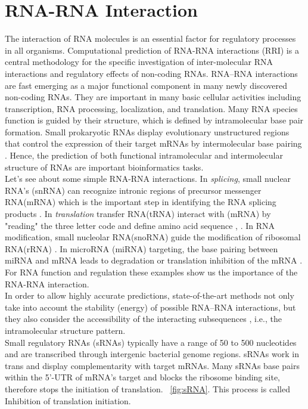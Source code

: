 \documentclass[twoside,a4paper]{report}
\numberwithin{equation}{section}
\begin{document}
	\section{RNA-RNA Interaction}
 	The interaction of RNA molecules is an essential factor for regulatory processes in all organisms. Computational prediction of RNA-RNA interactions (RRI) is a central methodology for the specific investigation of inter-molecular RNA interactions and regulatory effects of non-coding RNAs. RNA–RNA interactions are fast emerging as a major functional component in many newly discovered non-coding RNAs. They are important in many basic cellular activities including transcription, RNA processing, localization, and translation.  Many RNA species function is guided by their structure, which is defined by intramolecular base pair formation. Small prokaryotic RNAs display evolutionary unstructured regions that control the expression of their target mRNAs by intermolecular base pairing \citep{wright2013comparative}. Hence, the prediction of both functional intramolecular and intermolecular structure of RNAs are important bioinformatics tasks. \\
 	
 	Let's see about some simple RNA-RNA interactions. In \textit{splicing}, small nuclear RNA's (snRNA) can recognize intronic regions of precursor messenger RNA(mRNA) which is the important step in identifying the RNA splicing products \citep{modrek2002genomic}. In \textit{translation} transfer RNA(tRNA) interact with (mRNA) by "reading" the three letter code and define amino acid sequence \citep{selmer2006structure}, \citep{ibba2000aminoacyl}. In RNA modification, small nucleolar RNA(snoRNA) guide the modification of ribosomal RNA(rRNA) \citep{kiss2002small}. In microRNA (miRNA) targeting, the base pairing between  miRNA and mRNA leads to degradation or translation inhibition of the mRNA \citep{bartel2004micrornas}. For RNA function and regulation these examples show us the importance of the RNA-RNA interaction. \\
 		
 	In order to allow highly accurate predictions, state-of-the-art methods not only take into account the stability (energy) of possible RNA–RNA interactions, but they also consider the accessibility of the interacting subsequences \citep{umu2017comprehensive}, i.e., the intramolecular structure pattern.\\
 	
 	Small regulatory RNAs (sRNAs) typically have a range of 50 to 500 nucleotides and are transcribed through intergenic bacterial genome regions. sRNAs work in trans and display complementarity with target mRNAs. Many sRNAs base pairs within the 5'-UTR of  mRNA's target and blocks the ribosome binding site, therefore stops the initiation of translation. ~\ref{fig:sRNA}. This process is called Inhibition of translation initiation. \\
 	
\end{document}
